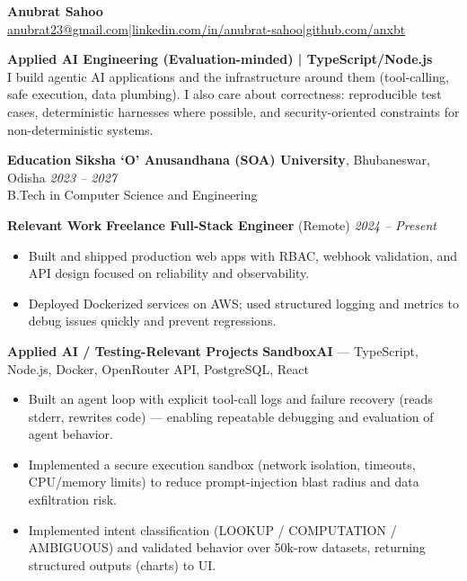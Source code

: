 \documentclass[10pt,a4paper]{article}
\begin{document}
\begin{center}
{\LARGE\bfseries Anubrat Sahoo}\\
\small \href{mailto:anubrat23@gmail.com}{anubrat23@gmail.com}\;|\;\href{https://linkedin.com/in/anubrat-sahoo}{linkedin.com/in/anubrat-sahoo}\;|\;\href{https://github.com/anxbt}{github.com/anxbt}
\end{center}

{\large\bfseries Applied AI Engineering (Evaluation-minded) | TypeScript/Node.js}\\
\small I build agentic AI applications and the infrastructure around them (tool-calling, safe execution, data plumbing). I also care about correctness: reproducible test cases, deterministic harnesses where possible, and security-oriented constraints for non-deterministic systems.

\vspace{6pt}
{\large\bfseries Education}
\vspace{2pt}
\textbf{Siksha ‘O’ Anusandhana (SOA) University}, Bhubaneswar, Odisha \hfill \textit{2023 -- 2027}\\
B.Tech in Computer Science and Engineering

\vspace{6pt}
{\large\bfseries Relevant Work}
\vspace{2pt}
\textbf{Freelance Full-Stack Engineer} (Remote) \hfill \textit{2024 -- Present}\\
\begin{itemize}
  \item Built and shipped production web apps with RBAC, webhook validation, and API design focused on reliability and observability.
  \item Deployed Dockerized services on AWS; used structured logging and metrics to debug issues quickly and prevent regressions.
\end{itemize}

\vspace{6pt}
{\large\bfseries Applied AI / Testing-Relevant Projects}
\vspace{2pt}
\textbf{SandboxAI} — TypeScript, Node.js, Docker, OpenRouter API, PostgreSQL, React\\
\begin{itemize}
  \item Built an agent loop with explicit tool-call logs and failure recovery (reads stderr, rewrites code) — enabling repeatable debugging and evaluation of agent behavior.
  \item Implemented a secure execution sandbox (network isolation, timeouts, CPU/memory limits) to reduce prompt-injection blast radius and data exfiltration risk.
  \item Implemented intent classification (LOOKUP / COMPUTATION / AMBIGUOUS) and validated behavior over 50k-row datasets, returning structured outputs (charts) to UI.
\end{itemize}
\end{document}
